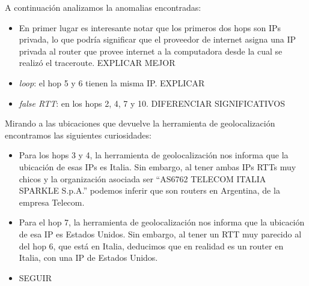 A continuación analizamos la anomalias encontradas:

\begin{itemize}
  \item En primer lugar es interesante notar que los primeros dos hops son IPs privada, lo que podría significar que el proveedor de internet asigna una IP privada al router que provee internet a la computadora desde la cual se realizó el traceroute. EXPLICAR MEJOR
  \item \textit{loop}: el hop 5 y 6 tienen la misma IP. EXPLICAR
  \item \textit{false RTT}: en los hops 2, 4, 7 y 10. DIFERENCIAR SIGNIFICATIVOS
\end{itemize}

Mirando a las ubicaciones que devuelve la herramienta de geolocalización encontramos las siguientes curiosidades:

\begin{itemize}
  \item Para los hops 3 y 4, la herramienta de geolocalización nos informa que la ubicación de esas IPs es Italia. Sin embargo, al tener ambas IPs RTTs muy chicos y la organización asociada ser ``AS6762 TELECOM ITALIA SPARKLE S.p.A.'' podemos inferir que son routers en Argentina, de la empresa Telecom.
  \item Para el hop 7,  la herramienta de geolocalización nos informa que la ubicación de esa IP es Estados Unidos. Sin embargo, al tener un RTT muy parecido al del hop 6, que está en Italia, deducimos que en realidad es un router en Italia, con una IP de Estados Unidos.
  \item SEGUIR
\end{itemize}

\begin{figure}[h]
    \centering
\end{figure}
